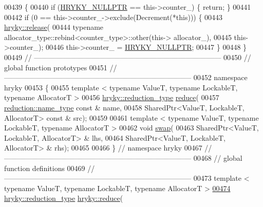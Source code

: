 \begin{DoxyCode}
00439 \{
00440     \textcolor{keywordflow}{if} (\hyperlink{common_8h_a4cd4ac09cfcdbd6b30ee69afc156e210}{HRYKY_NULLPTR} == this->counter\_) \{ \textcolor{keywordflow}{return}; \}
00441     
00442     \textcolor{keywordflow}{if} (0 == this->counter\_->exclude(Decrement(*\textcolor{keyword}{this}))) \{
00443         \hyperlink{namespacehryky_a9bdf380c3703ef316b807edae92a930a}{hryky::release}(
00444             \textcolor{keyword}{typename} allocator\_type::rebind<counter\_type>::other(this->
      allocator\_),
00445             this->counter\_);
00446         this->counter\_ = \hyperlink{common_8h_a4cd4ac09cfcdbd6b30ee69afc156e210}{HRYKY_NULLPTR};
00447     \}
00448 \}
00449 \textcolor{comment}{//
      ------------------------------------------------------------------------------}
00450 \textcolor{comment}{// global function prototypes}
00451 \textcolor{comment}{//
      ------------------------------------------------------------------------------}
00452 \textcolor{keyword}{namespace }hryky
00453 \{
00455     \textcolor{keyword}{template} < \textcolor{keyword}{typename} ValueT, \textcolor{keyword}{typename} LockableT, \textcolor{keyword}{typename} AllocatorT >
00456     \hyperlink{classhryky_1_1_intrusive_ptr}{hryky::reduction_type} \hyperlink{namespacehryky_af41cb3af6766761da0ff21b84527a52c}{reduce}(
00457         \hyperlink{namespacehryky_1_1reduction_ac686c30a4c8d196bbd0f05629a6b921f}{reduction::name_type} \textcolor{keyword}{const} & name,
00458         SharedPtr<ValueT, LockableT, AllocatorT> \textcolor{keyword}{const} & src);
00459 
00461     \textcolor{keyword}{template} < \textcolor{keyword}{typename} ValueT, \textcolor{keyword}{typename} LockableT, \textcolor{keyword}{typename} AllocatorT >
00462     \textcolor{keywordtype}{void} \hyperlink{namespacehryky_a4282146df5ea2b68cb667896a2205909}{swap}(
00463         SharedPtr<ValueT, LockableT, AllocatorT> & lhs,
00464         SharedPtr<ValueT, LockableT, AllocatorT> & rhs);
00465 
00466 \} \textcolor{comment}{// namespace hryky}
00467 \textcolor{comment}{//
      ------------------------------------------------------------------------------}
00468 \textcolor{comment}{// global function definitions}
00469 \textcolor{comment}{//
      ------------------------------------------------------------------------------}
00473 \textcolor{comment}{}\textcolor{keyword}{template} < \textcolor{keyword}{typename} ValueT, \textcolor{keyword}{typename} LockableT, \textcolor{keyword}{typename} AllocatorT >
\hypertarget{shared__ptr_8h_source_l00474}{}\hyperlink{namespacehryky_abe460d6765cad7fbca8945ceb1d9d52e}{00474} \hyperlink{classhryky_1_1_intrusive_ptr}{hryky::reduction_type} \hyperlink{namespacehryky_af41cb3af6766761da0ff21b84527a52c}{hryky::reduce}(

\end{DoxyCode}
